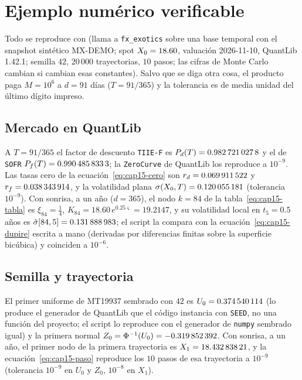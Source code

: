 \section{Ejemplo numérico verificable}\label{sec:cap15-ejemplo}

Todo se reproduce con  (llama a \texttt{fx\_exotics} sobre una base temporal con el
snapshot sintético MX-DEMO; spot $\Spot=18.60$, valuación 2026-11-10, QuantLib 1.42.1; semilla $42$, $20\,000$ trayectorias, $10$ pasos; las
cifras de Monte Carlo cambian si cambian esas constantes). Salvo que se diga otra cosa, el producto paga $M=10^{6}$ \MXN{} a $d=91$ días
($T=91/365$) y la tolerancia es de media unidad del último dígito impreso.

\subsection{Mercado en QuantLib}\label{sec:cap15-ej-mercado}

A $T=91/365$ el factor de descuento \texttt{TIIE-F} es $\DF{d}{T}=\verif{cap15-df-mxn-91}{0.9827210278}$ y el de \texttt{SOFR}
$\DF{f}{T}=\verif{cap15-df-sofr-91}{0.9904858333}$; la \texttt{ZeroCurve} de QuantLib los reproduce a $10^{-9}$. Las tasas cero de
la ecuación~\eqref{eq:cap15-cero} son $r_d=\verif{cap15-tasa-mxn-91}{0.069911522}$ y $r_f=\verif{cap15-tasa-sofr-91}{0.038343914}$, y la volatilidad plana
$\vol(\Spot,T)=\verif{cap15-vol-plana-91}{0.120055181}$ (tolerancia $10^{-9}$). Con sonrisa, a un año ($d=365$), el nodo $k=84$ de la
tabla~\eqref{eq:cap15-tabla} es $\xi_{84}=\tfrac14$, $K_{84}=18.60\,e^{0.25\varsigma}=19.2147$, y su volatilidad local en $t_5=0.5$ años es
$\hat\sigma[84,5]=\verif{cap15-vol-local-nodo}{0.131888983}$; el script la compara con la ecuación~\eqref{eq:cap15-dupire} escrita a mano
(derivadas por diferencias finitas sobre la superficie bicúbica) y coinciden a $10^{-6}$.

\subsection{Semilla y trayectoria}\label{sec:cap15-ej-semilla}

El primer uniforme de MT19937 sembrado con $42$ es $U_0=\verif{cap15-semilla-u0}{0.374540114}$ (lo produce el generador de QuantLib que el código instancia con
\texttt{SEED}, no una función del proyecto; el script lo reproduce con el generador de \texttt{numpy} sembrado igual) y la primera normal $Z_0=\Phi^{-1}(U_0)=\verif{cap15-semilla-z0}{-0.319852392}$. Con sonrisa, a un año, el primer nodo de la primera trayectoria es
$X_1=\verif{cap15-camino-x1}{18.43283821}$, y la ecuación~\eqref{eq:cap15-paso} reproduce los $10$ pasos de esa trayectoria a $10^{-9}$ (tolerancia $10^{-9}$ en $U_0$ y $Z_0$, $10^{-8}$ en $X_1$).


